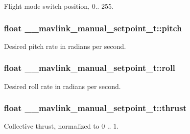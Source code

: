 Flight mode switch position, 0.. 255. 

\hypertarget{struct____mavlink__manual__setpoint__t_a17e3f9bb6707394163aafdbf02539694}{
\subsubsection[{pitch}]{\setlength{\rightskip}{0pt plus 5cm}float \+\_\+\+\_\+mavlink\+\_\+manual\+\_\+setpoint\+\_\+t\+::pitch}}\label{struct____mavlink__manual__setpoint__t_a17e3f9bb6707394163aafdbf02539694}


Desired pitch rate in radians per second. 

\hypertarget{struct____mavlink__manual__setpoint__t_ab0fe1187926dd2bbdfb30c2bdbffbeaf}{
\subsubsection[{roll}]{\setlength{\rightskip}{0pt plus 5cm}float \+\_\+\+\_\+mavlink\+\_\+manual\+\_\+setpoint\+\_\+t\+::roll}}\label{struct____mavlink__manual__setpoint__t_ab0fe1187926dd2bbdfb30c2bdbffbeaf}


Desired roll rate in radians per second. 

\hypertarget{struct____mavlink__manual__setpoint__t_a2044f740a7e79365a9edf603e5c29d3c}{
\subsubsection[{thrust}]{\setlength{\rightskip}{0pt plus 5cm}float \+\_\+\+\_\+mavlink\+\_\+manual\+\_\+setpoint\+\_\+t\+::thrust}}\label{struct____mavlink__manual__setpoint__t_a2044f740a7e79365a9edf603e5c29d3c}


Collective thrust, normalized to 0 .. 1. 

